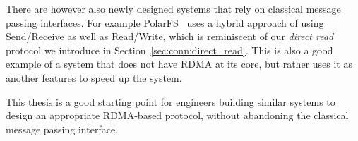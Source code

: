 There are however also newly designed systems that rely on classical message passing interfaces. For example 
PolarFS~\cite{polarfs} uses a hybrid approach of using Send/Receive as well as Read/Write, which is reminiscent of 
our \emph{direct read} protocol we introduce in Section~\ref{sec:conn:direct_read}. This is also a good example of a system 
that does not have RDMA at its core, but rather
uses it as another features to speed up the system. 

This thesis is a good starting point for engineers building similar systems to design an appropriate RDMA-based protocol,
without abandoning the classical message passing interface.



